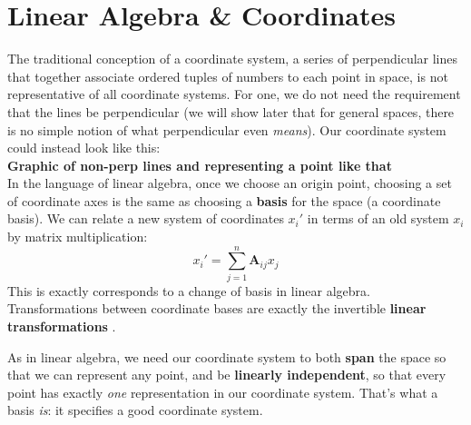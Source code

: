 	
	
	
	\section{Linear Algebra \& Coordinates} 
	\label{sec:Linear Algebra & Coordinates}%
	
	The traditional conception of a coordinate system, a series of perpendicular lines that together associate ordered tuples of numbers to each point in space, is not representative of all coordinate systems. For one, we do not need the requirement that the lines be perpendicular (we will show later that for general spaces, there is no simple notion of what perpendicular even \emph{means}). Our coordinate system could instead look like this:\\
	
	\textbf{Graphic of non-perp lines and representing a point like that}\\
	
	In the language of linear algebra, once we choose an origin point, choosing a set of coordinate axes is the same as choosing a \textbf{basis} for the space (a coordinate basis). We can relate a new system of coordinates $x_i'$ in terms of an old system $x_i$ by matrix multiplication:
	\begin{equation*}
		x_i' = \sum_{j=1}^n \mathbf A_{ij} x_j
	\end{equation*} 
	 This is exactly corresponds to a change of basis in linear algebra. Transformations between coordinate bases are exactly the invertible \textbf{linear transformations} .
	
	As in linear algebra, we need our coordinate system to both \textbf{span} the space so that we can represent any point, and be \textbf{linearly independent}, so that every point has exactly \emph{one} representation in our coordinate system. That's what a basis \emph{is}: it specifies a good coordinate system.\\
	
